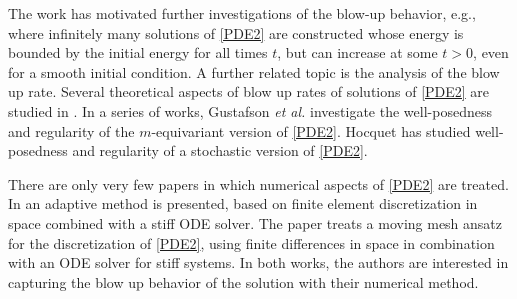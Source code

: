 \documentclass{siamltex}
\begin{document}
The work \cite{ChangDingYe1992} has motivated further investigations of the blow-up behavior, e.g., \cite{Bertsch_DalPasso_vanderHout_2002,Topp02} where infinitely many solutions of \eqref{PDE2} are constructed whose energy is  bounded by the initial energy for all times $t$, but can increase at some $t>0$, even for a smooth initial condition. 
A further related topic is the analysis   of the blow up rate. Several theoretical aspects of blow up rates of solutions of \eqref{PDE2} are studied in  \cite{vdBergHulshofKing2003,AngHulsMatano09,RaphaelSchweyer13}.
In a series of works, Gustafson \emph{et al.} \cite{GUAN20091,Gustafson_Nakanishi_Tsai_2010} investigate the well-posedness and regularity of the $m$-equivariant version of \eqref{PDE2}. Hocquet \cite{Hocquet19} has studied well-posedness and regularity of a stochastic version of \eqref{PDE2}.

 There are only very few papers in which numerical aspects  of \eqref{PDE2} are treated. In \cite{Schans06} an adaptive method is presented, based on finite element discretization in space combined with a stiff ODE solver. The paper \cite{HaynesHuangZegeling2013} treats a moving mesh ansatz for the discretization of \eqref{PDE2}, using  finite differences  in space in combination with an ODE solver for stiff systems. In both works, the authors are interested in capturing the blow up behavior of the solution with their numerical method. 
\end{document}
